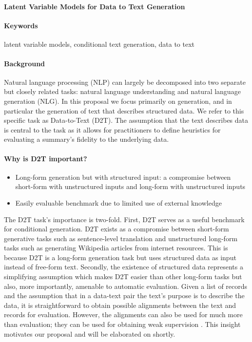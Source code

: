 \documentclass[11pt]{article}
\begin{document}

\begin{center}
\textbf{Latent Variable Models for Data to Text Generation}
\end{center}

\paragraph{Keywords}
latent variable models, conditional text generation, data to text

\paragraph{Background}
Natural language processing (NLP) can largely be decomposed into two separate but
closely related tasks: natural language understanding and natural language
generation (NLG).
In this proposal we focus primarily on generation, and in particular
the generation of text that describes structured data.
We refer to this specific task as Data-to-Text (D2T).
The assumption that the text describes data is central to the task as it allows
for practitioners to define heuristics for evaluating a summary's fidelity to the
underlying data.

\paragraph{Why is D2T important?}
\begin{itemize}
\item Long-form generation but with structured input: a compromise between
short-form with unstructured inputs and long-form with unstructured inputs
\item Easily evaluable benchmark due to limited use of external knowledge
\end{itemize}
The D2T task's importance is two-fold.
First, D2T serves as a useful benchmark for conditional generation.
D2T exists as a compromise between short-form generative tasks such as sentence-level
translation and unstructured long-form tasks such as generating Wikipedia articles
from internet resources.
This is because D2T is a long-form generation task but uses structured data
as input instead of free-form text.
Secondly, the existence of structured data represents a simplifying assumption
which makes D2T easier than other long-form tasks but also, more importantly,
amenable to automatic evaluation.
Given a list of records and the assumption that in a data-text pair the text's purpose
is to describe the data,
it is straightforward to obtain possible alignments between the text and records for evaluation.
However, the alignments can also be used for much more than evaluation; they can be used for
obtaining weak supervision \citep{puduppully2018contentselection}. %
This insight motivates our proposal and will be elaborated on shortly.
\end{document}
